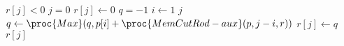 \begin{codebox}
\li \If $r[j] < 0$
\li \Then \If $j = 0$ 
\li     \Then $r[j] \gets 0$
\li     \Else 
\li         $q = -1$
\li         \For $i \gets 1$ \To $j$
\li         \Do $q \gets \proc{Max}(q, p[i]+\proc{MemCutRod-aux}(p,j-i,r))$
\li             $r[j] \gets q$
            \End
        \End
    \End
\li \Return $r[j]$
\end{codebox}